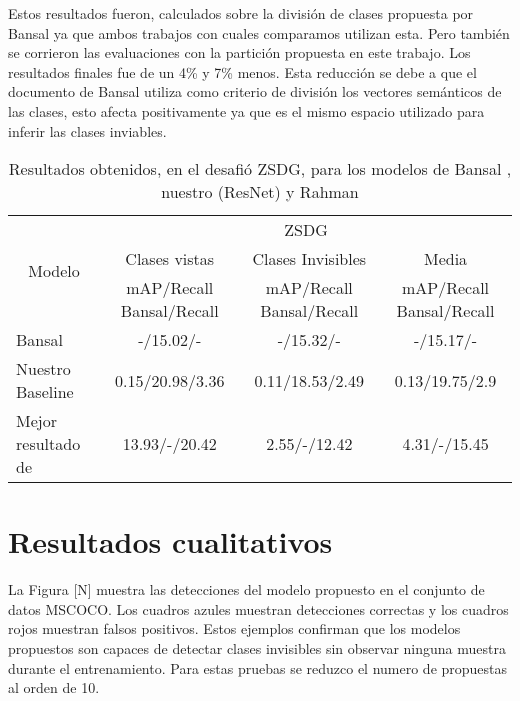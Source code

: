 Estos resultados fueron, calculados sobre la división de clases propuesta por Bansal ya que ambos trabajos con cuales comparamos utilizan esta. Pero también se corrieron las evaluaciones con la partición propuesta en este trabajo. Los resultados finales fue de un 4\% y 7\% menos. Esta reducción se debe a que el documento de Bansal utiliza como criterio de división los vectores semánticos de las clases, esto afecta positivamente ya que es el mismo espacio utilizado para inferir las clases inviables.

\begin{table}[]
	\centering
	\resizebox{12.5cm}{1.2cm} {
	\begin{tabular}{|l|c|c|c|}
		\hline
		\multicolumn{1}{|c|}{\multirow{3}{*}{Modelo}} & \multicolumn{3}{c|}{ZSDG}                                                       \\ \cline{2-4} 
		\multicolumn{1}{|c|}{}                        & Clases vistas             & Clases Invisibles        & Media                    \\ \cline{2-4} 
		\multicolumn{1}{|c|}{}                        & mAP/Recall Bansal/Recall  & mAP/Recall Bansal/Recall & mAP/Recall Bansal/Recall \\ \hline
		Bansal                                        & -/15.02/-                 & -/15.32/-                & -/15.17/-                \\ \hline
		Nuestro Baseline                              & 0.15/20.98/3.36           & 0.11/18.53/2.49          & 0.13/19.75/2.9           \\ \hline
		Mejor  resultado de \cite{rahman2020zero}     & 13.93/-/20.42             & 2.55/-/12.42             & 4.31/-/15.45             \\ \hline
	\end{tabular}
	}
	\caption{Resultados obtenidos, en el desafió ZSDG, para los modelos de Bansal \cite{bansal2018zero}, nuestro (ResNet) y Rahman \cite{rahman2020zero}}
	\label{tab:resultados-zsdg}
\end{table}

\section{Resultados cualitativos} \label{sec:resultadoscualitativos}

La Figura [N] muestra las detecciones del modelo propuesto en el conjunto de datos MSCOCO. Los cuadros azules muestran detecciones correctas y los cuadros rojos muestran falsos positivos. Estos ejemplos confirman que los modelos propuestos son capaces de detectar clases invisibles sin observar ninguna muestra durante el entrenamiento. Para estas pruebas se reduzco el numero de propuestas al orden de 10.

